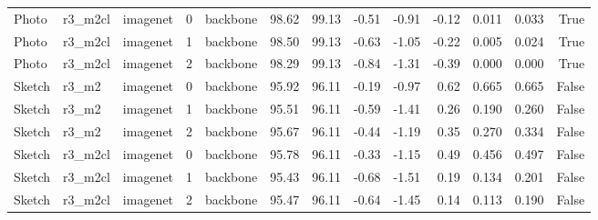 \begin{table}
\begin{tabular}{lllrlrrrrrllr}
Photo & r3\_m2cl & imagenet & 0 & backbone & 98.62 & 99.13 & -0.51 & -0.91 & -0.12 & 0.011 & 0.033 & True \\
Photo & r3\_m2cl & imagenet & 1 & backbone & 98.50 & 99.13 & -0.63 & -1.05 & -0.22 & 0.005 & 0.024 & True \\
Photo & r3\_m2cl & imagenet & 2 & backbone & 98.29 & 99.13 & -0.84 & -1.31 & -0.39 & 0.000 & 0.000 & True \\
Sketch & r3\_m2 & imagenet & 0 & backbone & 95.92 & 96.11 & -0.19 & -0.97 & 0.62 & 0.665 & 0.665 & False \\
Sketch & r3\_m2 & imagenet & 1 & backbone & 95.51 & 96.11 & -0.59 & -1.41 & 0.26 & 0.190 & 0.260 & False \\
Sketch & r3\_m2 & imagenet & 2 & backbone & 95.67 & 96.11 & -0.44 & -1.19 & 0.35 & 0.270 & 0.334 & False \\
Sketch & r3\_m2cl & imagenet & 0 & backbone & 95.78 & 96.11 & -0.33 & -1.15 & 0.49 & 0.456 & 0.497 & False \\
Sketch & r3\_m2cl & imagenet & 1 & backbone & 95.43 & 96.11 & -0.68 & -1.51 & 0.19 & 0.134 & 0.201 & False \\
Sketch & r3\_m2cl & imagenet & 2 & backbone & 95.47 & 96.11 & -0.64 & -1.45 & 0.14 & 0.113 & 0.190 & False \\
\bottomrule
\end{tabular}
\end{table}
